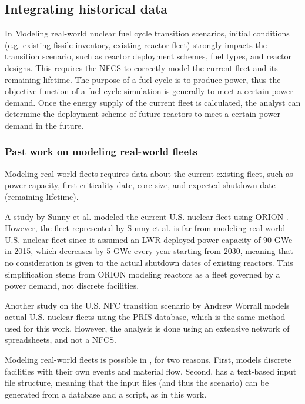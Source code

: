 \subsection{Integrating historical data}
In Modeling real-world nuclear fuel cycle transition scenarios, initial
conditions (e.g. existing fissile inventory, existing reactor fleet) 
strongly impacts
the transition scenario, such as reactor deployment
schemes, fuel types, and reactor designs. 
This requires the \gls{NFCS} to correctly model the current fleet and its
remaining lifetime. The purpose of a fuel cycle is to produce power, thus the objective
function of a fuel cycle simulation is generally to meet a certain power demand.
Once the energy supply of the current fleet is calculated,
the analyst can determine the deployment scheme of future reactors to meet a certain
power demand in the future. 

\subsubsection{Past work on modeling real-world fleets}
Modeling real-world fleets requires data about the current existing fleet,
such as power capacity, first criticality date, core size, and expected shutdown date (remaining lifetime).

A study by Sunny et al. modeled the current U.S. nuclear fleet
using ORION \cite{sunny_transition_2015}. However, the fleet represented
by Sunny et al. is far from
modeling real-world U.S. nuclear fleet since it assumed an \gls{LWR} deployed power capacity
of 90 GWe in 2015, which decreases by 5 GWe every year starting from 2030,
meaning that no consideration is given to the actual shutdown dates of
existing reactors. This simplification stems from ORION modeling reactors as
a fleet governed by a power demand, not discrete facilities.

Another study on the U.S. \gls{NFC} transition scenario by Andrew Worrall \cite{worrall_utilization_2013}
models actual U.S. nuclear fleets using the \gls{PRIS} database, which is the same
method used for this work. However, the analysis is done using an extensive
network of spreadsheets, and not a \gls{NFCS}.

Modeling real-world fleets is possible in \Cyclus, for two
reasons. First, \Cyclus models
discrete facilities with their own events and material flow.
Second, \Cyclus has a text-based input file structure, meaning that
the input files (and thus the scenario) can be generated from 
a database and a script, as in this work.


